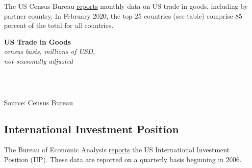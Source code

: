 \documentclass{report}
\begin{document}
{{{{{{{\begin{minipage}{0.76\textwidth}

\small The US Census Bureau \href{https://www.census.gov/foreign-trade/data/index.html}{reports} monthly data on US trade in goods, including by partner country. In February 2020, the top 25 countries (see table) comprise 85 percent of the total for all countries. 

\end{minipage}

\vspace{4mm}


\noindent \normalsize \textbf{US Trade in Goods} \hspace{12mm}  \hspace{18mm} \\
\footnotesize{\textit{census basis, millions of USD,}}\\
\footnotesize{\textit{not seasonally adjusted}}\\

\vspace{-3mm}

\noindent \hspace*{-3mm}  \setlength{\tabcolsep}{3.0pt} \color{black!90}
		{\renewcommand{\arraystretch}{1.54}
		 \begin{tabular}{p{30mm} R{12mm} R{12mm} R{12mm}  R{15mm} R{12mm} R{12mm}}
			 \hline
		\end{tabular}}	\\

\vspace{-3mm}		
		
\footnotesize{Source: Census Bureau}


\newpage

\begin{minipage}{0.76\textwidth}

\subsection*{\color{black!70} \seriffont International Investment Position}

\small The Bureau of Economic Analysis \href{https://www.bea.gov/data/intl-trade-investment/international-investment-position}{reports} the US International Investment Position (IIP). These data are reported on a quarterly basis beginning in 2006. \\ 


\end{minipage}}}}}}}}
\end{document}
